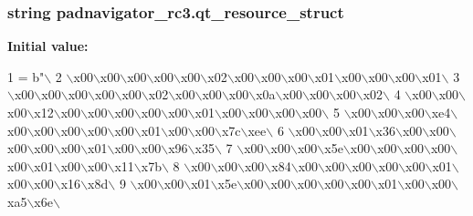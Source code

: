 \subsubsection[{qt\+\_\+resource\+\_\+struct}]{\setlength{\rightskip}{0pt plus 5cm}string padnavigator\+\_\+rc3.\+qt\+\_\+resource\+\_\+struct}\label{namespacepadnavigator__rc3_a2b9a5df2230844d81c54e89bdfd25541}
{\bfseries Initial value\+:}
\begin{DoxyCode}
1 = b\textcolor{stringliteral}{"\(\backslash\)}
2 \textcolor{stringliteral}{\(\backslash\)x00\(\backslash\)x00\(\backslash\)x00\(\backslash\)x00\(\backslash\)x00\(\backslash\)x02\(\backslash\)x00\(\backslash\)x00\(\backslash\)x00\(\backslash\)x01\(\backslash\)x00\(\backslash\)x00\(\backslash\)x00\(\backslash\)x01\(\backslash\)}
3 \textcolor{stringliteral}{\(\backslash\)x00\(\backslash\)x00\(\backslash\)x00\(\backslash\)x00\(\backslash\)x00\(\backslash\)x02\(\backslash\)x00\(\backslash\)x00\(\backslash\)x00\(\backslash\)x0a\(\backslash\)x00\(\backslash\)x00\(\backslash\)x00\(\backslash\)x02\(\backslash\)}
4 \textcolor{stringliteral}{\(\backslash\)x00\(\backslash\)x00\(\backslash\)x00\(\backslash\)x12\(\backslash\)x00\(\backslash\)x00\(\backslash\)x00\(\backslash\)x00\(\backslash\)x00\(\backslash\)x01\(\backslash\)x00\(\backslash\)x00\(\backslash\)x00\(\backslash\)x00\(\backslash\)}
5 \textcolor{stringliteral}{\(\backslash\)x00\(\backslash\)x00\(\backslash\)x00\(\backslash\)xe4\(\backslash\)x00\(\backslash\)x00\(\backslash\)x00\(\backslash\)x00\(\backslash\)x00\(\backslash\)x01\(\backslash\)x00\(\backslash\)x00\(\backslash\)x7c\(\backslash\)xee\(\backslash\)}
6 \textcolor{stringliteral}{\(\backslash\)x00\(\backslash\)x00\(\backslash\)x01\(\backslash\)x36\(\backslash\)x00\(\backslash\)x00\(\backslash\)x00\(\backslash\)x00\(\backslash\)x00\(\backslash\)x01\(\backslash\)x00\(\backslash\)x00\(\backslash\)x96\(\backslash\)x35\(\backslash\)}
7 \textcolor{stringliteral}{\(\backslash\)x00\(\backslash\)x00\(\backslash\)x00\(\backslash\)x5e\(\backslash\)x00\(\backslash\)x00\(\backslash\)x00\(\backslash\)x00\(\backslash\)x00\(\backslash\)x01\(\backslash\)x00\(\backslash\)x00\(\backslash\)x11\(\backslash\)x7b\(\backslash\)}
8 \textcolor{stringliteral}{\(\backslash\)x00\(\backslash\)x00\(\backslash\)x00\(\backslash\)x84\(\backslash\)x00\(\backslash\)x00\(\backslash\)x00\(\backslash\)x00\(\backslash\)x00\(\backslash\)x01\(\backslash\)x00\(\backslash\)x00\(\backslash\)x16\(\backslash\)x8d\(\backslash\)}
9 \textcolor{stringliteral}{\(\backslash\)x00\(\backslash\)x00\(\backslash\)x01\(\backslash\)x5e\(\backslash\)x00\(\backslash\)x00\(\backslash\)x00\(\backslash\)x00\(\backslash\)x00\(\backslash\)x01\(\backslash\)x00\(\backslash\)x00\(\backslash\)xa5\(\backslash\)x6e\(\backslash\)}

\end{DoxyCode}
